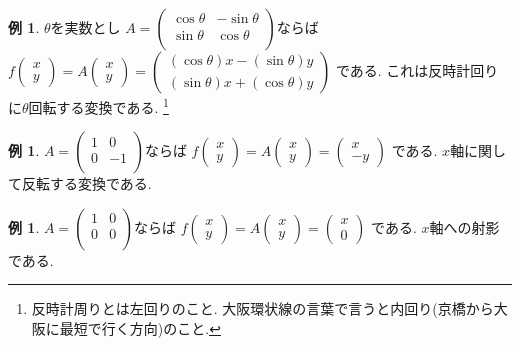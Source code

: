 \documentclass[dvipdfmx,a4paper,11pt]{article}
\theoremstyle{definition}
\newtheorem{exa}[thm]{例}
\begin{document}
   \begin{exa}$\theta$を実数とし
$
A=\begin{pmatrix}
\cos \theta & -\sin \theta\\
\sin \theta& \cos \theta  \\
\end{pmatrix}
$ならば
$
f\begin{pmatrix}
x \\ y
 \end{pmatrix} 
 =
 A
\begin{pmatrix}
x \\ y
 \end{pmatrix}  = 
 \begin{pmatrix}
(\cos \theta ) x - (\sin \theta )y \\
(\sin \theta ) x + (\cos \theta )y 
 \end{pmatrix}
$
である. これは反時計回りに$\theta$回転する変換である. \footnote{反時計周りとは左回りのこと. 大阪環状線の言葉で言うと内回り(京橋から大阪に最短で行く方向)のこと. }
\end{exa}
 
 \begin{exa}
$
A=\begin{pmatrix}
1& 0 \\
0& -1 \\
\end{pmatrix}
$ならば
$
f\begin{pmatrix}
x \\ y
 \end{pmatrix} 
 =
 A
\begin{pmatrix}
x \\ y
 \end{pmatrix}  = 
 \begin{pmatrix}
x \\-y
 \end{pmatrix}
$
である. $x$軸に関して反転する変換である. 
\end{exa}
 
  \begin{exa}
$
A=\begin{pmatrix}
1& 0 \\
0& 0 \\
\end{pmatrix}
$ならば
$
f\begin{pmatrix}
x \\ y
 \end{pmatrix} 
 =
 A
\begin{pmatrix}
x \\ y
 \end{pmatrix}  = 
 \begin{pmatrix}
x \\0
 \end{pmatrix}
$
である. $x$軸への射影である.  
\end{exa}
 
\end{document}
